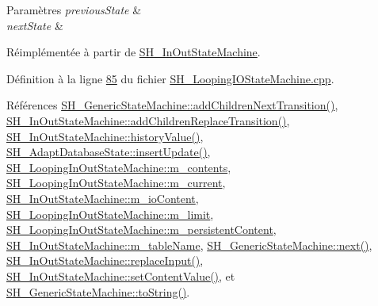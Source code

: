 \begin{DoxyParams}{Paramètres}
{\em previous\-State} & \\
\hline
{\em next\-State} & \\
\hline
\end{DoxyParams}


Réimplémentée à partir de \hyperlink{classSH__InOutStateMachine_aa78420f8778d7777809aad77eb8473b4}{S\-H\-\_\-\-In\-Out\-State\-Machine}.



Définition à la ligne \hyperlink{SH__LoopingIOStateMachine_8cpp_source_l00085}{85} du fichier \hyperlink{SH__LoopingIOStateMachine_8cpp_source}{S\-H\-\_\-\-Looping\-I\-O\-State\-Machine.\-cpp}.



Références \hyperlink{classSH__GenericStateMachine_a22433f8df2f41120a05bfa4bbfa9e0ae}{S\-H\-\_\-\-Generic\-State\-Machine\-::add\-Children\-Next\-Transition()}, \hyperlink{classSH__InOutStateMachine_ae0f3b4622d2c70884bb224dee86e95c0}{S\-H\-\_\-\-In\-Out\-State\-Machine\-::add\-Children\-Replace\-Transition()}, \hyperlink{classSH__InOutStateMachine_af71bfdb3b59b7bf2763588b513b4205f}{S\-H\-\_\-\-In\-Out\-State\-Machine\-::history\-Value()}, \hyperlink{classSH__AdaptDatabaseState_a037db544ea05f42d21fcbdda758839fe}{S\-H\-\_\-\-Adapt\-Database\-State\-::insert\-Update()}, \hyperlink{classSH__LoopingInOutStateMachine_a145e625dcb4d5438bd9c761eeb9425d4}{S\-H\-\_\-\-Looping\-In\-Out\-State\-Machine\-::m\-\_\-contents}, \hyperlink{classSH__LoopingInOutStateMachine_af64f9f28a1b8e82bd9ee5f4b96a7c82e}{S\-H\-\_\-\-Looping\-In\-Out\-State\-Machine\-::m\-\_\-current}, \hyperlink{classSH__InOutStateMachine_a8cfbc27eef057bf37b7711bdfef2077e}{S\-H\-\_\-\-In\-Out\-State\-Machine\-::m\-\_\-io\-Content}, \hyperlink{classSH__LoopingInOutStateMachine_a818a60d3691fcac11323ad114c309dcb}{S\-H\-\_\-\-Looping\-In\-Out\-State\-Machine\-::m\-\_\-limit}, \hyperlink{classSH__LoopingInOutStateMachine_a4e9ea23cf1eecbe26c6ed93b290a9115}{S\-H\-\_\-\-Looping\-In\-Out\-State\-Machine\-::m\-\_\-persistent\-Content}, \hyperlink{classSH__InOutStateMachine_aa009eecc5ab6181358faafb5996b6006}{S\-H\-\_\-\-In\-Out\-State\-Machine\-::m\-\_\-table\-Name}, \hyperlink{classSH__GenericStateMachine_af4771d31d87951c997fba1633c2d67f6}{S\-H\-\_\-\-Generic\-State\-Machine\-::next()}, \hyperlink{classSH__InOutStateMachine_a9fa5db44086de2576c812f631aa4f60a}{S\-H\-\_\-\-In\-Out\-State\-Machine\-::replace\-Input()}, \hyperlink{classSH__InOutStateMachine_a9ab1534306b2bdb62743d4bcefe40c17}{S\-H\-\_\-\-In\-Out\-State\-Machine\-::set\-Content\-Value()}, et \hyperlink{classSH__GenericStateMachine_a85c0c1c9d258ae991f84667412fa47cd}{S\-H\-\_\-\-Generic\-State\-Machine\-::to\-String()}.



